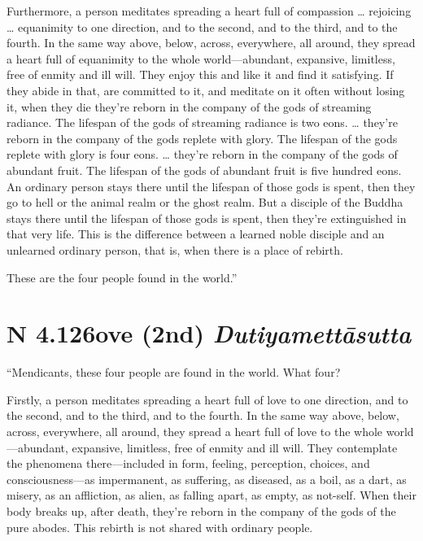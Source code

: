 \documentclass[12pt,openany]{book}%
\newcommand*{\suttatitleacronym}[1]{\smaller[2]{#1}\vspace*{.3em}}
\newcommand*{\suttatitletranslation}[1]{\linebreak{#1}}
\newcommand*{\suttatitleroot}[1]{\linebreak\smaller[2]\itshape{#1}}
\newcommand*{\tocacronym}[1]{\hspace*{-3.3em}{#1}\quad}
\newcommand*{\toctranslation}[1]{#1}
\newcommand*{\tocroot}[1]{(\textit{#1})}
\begin{document}
Furthermore, a person meditates spreading a heart full of compassion … rejoicing … equanimity to one direction, and to the second, and to the third, and to the fourth. In the same way above, below, across, everywhere, all around, they spread a heart full of equanimity to the whole world—abundant, expansive, limitless, free of enmity and ill will. They enjoy this and like it and find it satisfying. If they abide in that, are committed to it, and meditate on it often without losing it, when they die they’re reborn in the company of the gods of streaming radiance. The lifespan of the gods of streaming radiance is two eons. … they’re reborn in the company of the gods replete with glory. The lifespan of the gods replete with glory is four eons. … they’re reborn in the company of the gods of abundant fruit. The lifespan of the gods of abundant fruit is five hundred eons. An ordinary person stays there until the lifespan of those gods is spent, then they go to hell or the animal realm or the ghost realm. But a disciple of the Buddha stays there until the lifespan of those gods is spent, then they’re extinguished in that very life. This is the difference between a learned noble disciple and an unlearned ordinary person, that is, when there is a place of rebirth. 

These are the four people found in the world.” 

%
\section*{{\suttatitleacronym AN 4.126}{\suttatitletranslation Love (2nd) }{\suttatitleroot Dutiyamettāsutta}}
\addcontentsline{toc}{section}{\tocacronym{AN 4.126} \toctranslation{Love (2nd) } \tocroot{Dutiyamettāsutta}}

“Mendicants, these four people are found in the world. What four? 

Firstly, a person meditates spreading a heart full of love to one direction, and to the second, and to the third, and to the fourth. In the same way above, below, across, everywhere, all around, they spread a heart full of love to the whole world—abundant, expansive, limitless, free of enmity and ill will. They contemplate the phenomena there—included in form, feeling, perception, choices, and consciousness—as impermanent, as suffering, as diseased, as a boil, as a dart, as misery, as an affliction, as alien, as falling apart, as empty, as not-self. When their body breaks up, after death, they’re reborn in the company of the gods of the pure abodes. This rebirth is not shared with ordinary people. 
\end{document}
